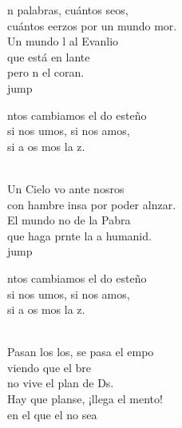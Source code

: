 \begin{cancion}%
	n palabras, cuántos seos,\\
	cuántos eerzos por un mundo mor.\\
	Un mundo l al Evanlio\\
	que está en lante \\
	pero n el coran. \\jump\\
	\begin{chorus}%
	ntos cambiamos el do esteño\\
	si nos umos, si nos amos,\\
	si a os mos la z.\\
	\end{chorus}%
	\jump\\
	Un Cielo vo ante nosros\\
	con hambre insa por poder alnzar.\\
	El mundo no de la Pabra\\
	que haga prnte la a humanid.\\jump\\
	\begin{chorus}%
	ntos cambiamos el do esteño\\
	si nos umos, si nos amos,\\
	si a os mos la z.\\
	\end{chorus}%
	\jump\\
	Pasan los los, se pasa el empo\\
	viendo que el bre \\
	no vive el plan de Ds.\\
	Hay que planse, ¡llega el mento!\\
	en el que el no sea \\

\end{cancion}
